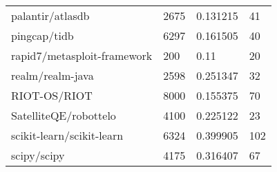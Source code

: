 \begin{table}[]
\begin{tabular}{llll}
palantir/atlasdb                            & 2675                               & 0.131215                                                                                                          & 41                                                                                                            \\
pingcap/tidb                                & 6297                               & 0.161505                                                                                                          & 40                                                                                                            \\
rapid7/metasploit-framework                 & 200                                & 0.11                                                                                                              & 20                                                                                                            \\
realm/realm-java                            & 2598                               & 0.251347                                                                                                          & 32                                                                                                            \\
RIOT-OS/RIOT                                & 8000                               & 0.155375                                                                                                          & 70                                                                                                            \\
SatelliteQE/robottelo                       & 4100                               & 0.225122                                                                                                          & 23                                                                                                            \\
scikit-learn/scikit-learn                   & 6324                               & 0.399905                                                                                                          & 102                                                                                                           \\
scipy/scipy                                 & 4175                               & 0.316407                                                                                                          & 67                                                                                                            \\

\end{tabular}
\end{table}
